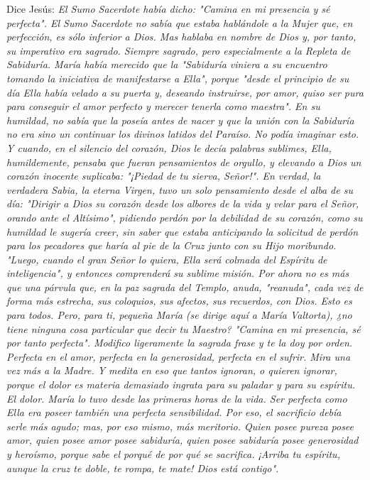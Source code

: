 \documentclass[12pt, twoside, openright]{book} %
\begin{document}
Dice Jesús: 
\emph{El Sumo Sacerdote había dicho: "Camina en mi presencia y sé perfecta". El Sumo Sacerdote no sabía que estaba hablándole a la Mujer que, en perfección, es sólo inferior a Dios. Mas hablaba en nombre de Dios y, por tanto, su imperativo era sagrado. Siempre sagrado, pero especialmente a la Repleta de Sabiduría. María había merecido que la "Sabiduría viniera a su encuentro tomando la iniciativa de manifestarse a Ella", porque "desde el principio de su día Ella había velado a su puerta y, deseando instruirse, por amor, quiso ser pura para conseguir el amor perfecto y merecer tenerla como maestra". En su humildad, no sabía que la poseía antes de nacer y que la unión con la Sabiduría no era sino un continuar los divinos latidos del Paraíso. No podía imaginar esto. Y cuando, en el silencio del corazón, Dios le decía palabras sublimes, Ella, humildemente, pensaba que fueran pensamientos de orgullo, y elevando a Dios un corazón inocente suplicaba: "¡Piedad de tu sierva, Señor!". En verdad, la verdadera Sabia, la eterna Virgen, tuvo un solo pensamiento desde el alba de su día: "Dirigir a Dios su corazón desde los albores de la vida y velar para el Señor, orando ante el Altísimo", pidiendo perdón por la debilidad de su corazón, como su humildad le sugería creer, sin saber que estaba anticipando la solicitud de perdón para los pecadores que haría al pie de la Cruz junto con su Hijo moribundo. "Luego, cuando el gran Señor lo quiera, Ella será colmada del Espíritu de inteligencia", y entonces comprenderá su sublime misión. Por ahora no es más que una párvula que, en la paz sagrada del Templo, anuda, "reanuda", cada vez de forma más estrecha, sus coloquios, sus afectos, sus recuerdos, con Dios. Esto es para todos. Pero, para ti, pequeña María (se dirige aquí a María Valtorta), ¿no tiene ninguna cosa particular que decir tu Maestro? "Camina en mi presencia, sé por tanto perfecta". Modifico ligeramente la sagrada frase y te la doy por orden. Perfecta en el amor, perfecta en la generosidad, perfecta en el sufrir. Mira una vez más a la Madre. Y medita en eso que tantos ignoran, o quieren ignorar, porque el dolor es materia demasiado ingrata para su paladar y para su espíritu. El dolor. María lo tuvo desde las primeras horas de la vida. Ser perfecta como Ella era poseer también una perfecta sensibilidad. Por eso, el sacrificio debía serle más agudo; mas, por eso mismo, más meritorio. Quien posee pureza posee amor, quien posee amor posee sabiduría, quien posee sabiduría posee generosidad y heroísmo, porque sabe el porqué de por qué se sacrifica. ¡Arriba tu espíritu, aunque la cruz te doble, te rompa, te mate! Dios está contigo". }
 
\end{document}
